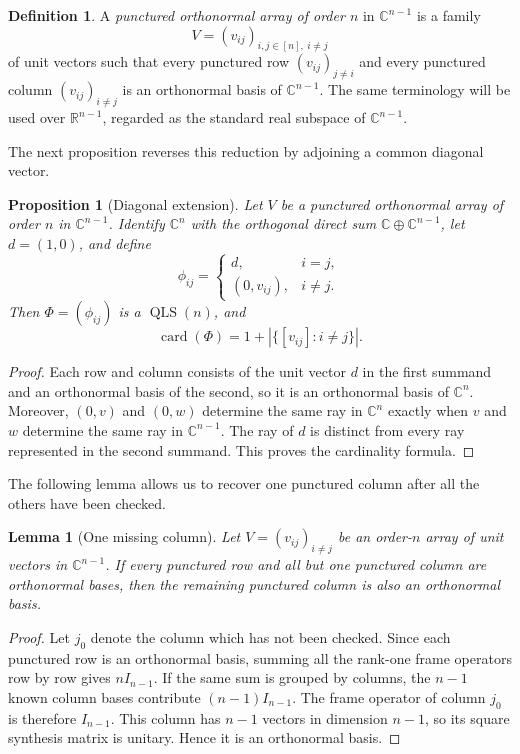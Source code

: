 \documentclass[11pt]{article}
\newtheorem{proposition}[theorem]{Proposition}
\newtheorem{lemma}[theorem]{Lemma}
\theoremstyle{definition}
\newtheorem{definition}[theorem]{Definition}
\newcommand{\C}{\mathbb C}
\newcommand{\R}{\mathbb R}
\newcommand{\card}{\operatorname{card}}
\newcommand{\ray}[1]{[#1]}
\begin{document}
\begin{definition}
A \emph{punctured orthonormal array of order $n$} in $\C^{n-1}$ is a family
\[
V=(v_{ij})_{i,j\in[n],\ i\ne j}
\]
of unit vectors such that every punctured row $(v_{ij})_{j\ne i}$ and every
punctured column $(v_{ij})_{i\ne j}$ is an orthonormal basis of $\C^{n-1}$.
The same terminology will be used over $\R^{n-1}$, regarded as the standard
real subspace of $\C^{n-1}$.
\end{definition}

The next proposition reverses this reduction by adjoining a common diagonal
vector.

\begin{proposition}[Diagonal extension]\label{prop:diagonal-extension}
Let $V$ be a punctured orthonormal array of order $n$ in $\C^{n-1}$.
Identify $\C^n$ with the orthogonal direct sum $\C\oplus\C^{n-1}$, let
$d=(1,0)$, and define
\[
\phi_{ij}=\begin{cases}
d,&i=j,\\
(0,v_{ij}),&i\ne j.
\end{cases}
\]
Then $\Phi=(\phi_{ij})$ is a $\operatorname{QLS}(n)$, and
\[
\card(\Phi)=1+\left|\{\ray{v_{ij}}:i\ne j\}\right|.
\]
\end{proposition}

\begin{proof}
Each row and column consists of the unit vector $d$ in the first summand and
an orthonormal basis of the second, so it is an orthonormal basis of $\C^n$.
Moreover, $(0,v)$ and $(0,w)$ determine the same ray in $\C^n$ exactly when
$v$ and $w$ determine the same ray in $\C^{n-1}$.  The ray of $d$ is distinct
from every ray represented in the second summand.  This proves the
cardinality formula.
\end{proof}

The following lemma allows us to recover one punctured column after all the
others have been checked.

\begin{lemma}[One missing column]\label{lem:missing-column}
Let $V=(v_{ij})_{i\ne j}$ be an order-$n$ array of unit vectors in
$\C^{n-1}$.  If every punctured row and all but one punctured column are
orthonormal bases, then the remaining punctured column is also an
orthonormal basis.
\end{lemma}

\begin{proof}
Let $j_0$ denote the column which has not been checked.  Since each punctured
row is an orthonormal basis, summing all the rank-one frame operators row by
row gives $nI_{n-1}$.  If the same sum is grouped by columns, the $n-1$ known
column bases contribute $(n-1)I_{n-1}$.  The frame operator of column $j_0$
is therefore $I_{n-1}$.  This column has $n-1$ vectors in dimension $n-1$,
so its square synthesis matrix is unitary.  Hence it is an orthonormal basis.
\end{proof}
\end{document}
